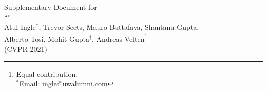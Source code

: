 \renewcommand{\figurename}{Supplementary Figure}
\renewcommand{\thesection}{Supplementary Note \arabic{section}}
\renewcommand{\theequation}{S\arabic{equation}}
\setcounter{figure}{0}
\setcounter{section}{0}
\setcounter{equation}{0}
\setcounter{page}{1}
\renewcommand*{\thefootnote}{$\dagger$}

\begin{center}
\huge Supplementary Document for\\
\huge ``\mytitle'' \\[0.7cm]
\large Atul Ingle$^\ast$, Trevor Seets, Mauro Buttafava, Shantanu Gupta, \\
Alberto Tosi, Mohit Gupta$^\dagger$, Andreas Velten\footnote{Equal contribution.\\
$^\ast$Email: ingle@uwalumni.com}\\[0.5cm]
(CVPR 2021)
\end{center}

\renewcommand*{\thefootnote}{\arabic{footnote}}


\clearpage

\clearpage

\clearpage

\clearpage

\clearpage



